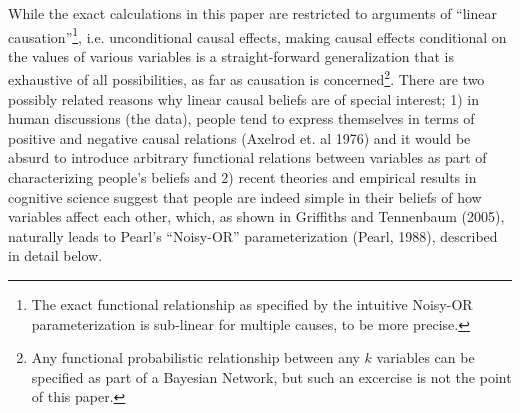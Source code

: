 \documentclass[11pt]{article}
\begin{document}
While the exact calculations in this paper are restricted to arguments of ``linear causation''\footnote{The exact functional relationship as specified by the intuitive Noisy-OR parameterization is sub-linear for multiple causes, to be more precise.
 }, i.e. unconditional causal effects, making causal effects conditional on the values of various variables is a straight-forward generalization that is exhaustive of all possibilities, as far as causation is concerned\footnote{Any functional probabilistic relationship between any $k$ variables can be specified as part of a Bayesian Network, but such an excercise is not the point of this paper.
 }. There are two possibly related reasons why linear causal beliefs are of special interest; 1) in human discussions (the data), people tend to express themselves in terms of positive and negative causal relations (Axelrod et. al 1976) and it would be absurd to introduce arbitrary functional relations between variables as part of characterizing people's beliefs and 2) recent theories and empirical results in cognitive science suggest that people are indeed simple in their beliefs of how variables affect each other, which, as shown in Griffiths and Tennenbaum (2005), naturally leads to Pearl's ``Noisy-OR'' parameterization (Pearl, 1988), described in detail below.
\end{document}
